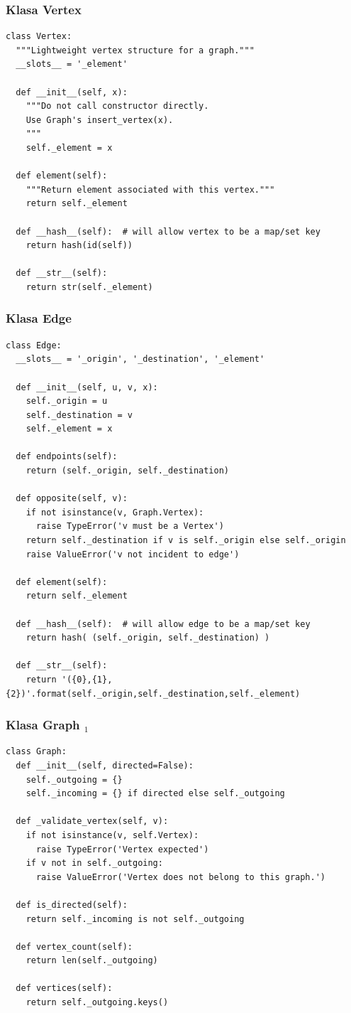 \documentclass[compress,aspectratio=169]{beamer}
\begin{document}
\begin{frame}
  \frametitle{Klasa Vertex}
\begin{verbatim}
class Vertex:
  """Lightweight vertex structure for a graph."""
  __slots__ = '_element'

  def __init__(self, x):
    """Do not call constructor directly. 
    Use Graph's insert_vertex(x).
    """
    self._element = x

  def element(self):
    """Return element associated with this vertex."""
    return self._element

  def __hash__(self):  # will allow vertex to be a map/set key
    return hash(id(self))

  def __str__(self):
    return str(self._element)
\end{verbatim}
\end{frame}

\begin{frame}
  \frametitle{Klasa Edge}
\begin{verbatim}
class Edge:
  __slots__ = '_origin', '_destination', '_element'

  def __init__(self, u, v, x):
    self._origin = u
    self._destination = v
    self._element = x

  def endpoints(self):
    return (self._origin, self._destination)

  def opposite(self, v):
    if not isinstance(v, Graph.Vertex):
      raise TypeError('v must be a Vertex')
    return self._destination if v is self._origin else self._origin
    raise ValueError('v not incident to edge')

  def element(self):
    return self._element

  def __hash__(self):  # will allow edge to be a map/set key
    return hash( (self._origin, self._destination) )

  def __str__(self):
    return '({0},{1},{2})'.format(self._origin,self._destination,self._element)
\end{verbatim}
\end{frame}

\begin{frame}
  \frametitle{Klasa Graph $_1$}
\begin{verbatim}
class Graph:
  def __init__(self, directed=False):
    self._outgoing = {}
    self._incoming = {} if directed else self._outgoing

  def _validate_vertex(self, v):
    if not isinstance(v, self.Vertex):
      raise TypeError('Vertex expected')
    if v not in self._outgoing:
      raise ValueError('Vertex does not belong to this graph.')
    
  def is_directed(self):
    return self._incoming is not self._outgoing

  def vertex_count(self):
    return len(self._outgoing)

  def vertices(self):
    return self._outgoing.keys()
\end{verbatim}
\end{frame}
\end{document}
